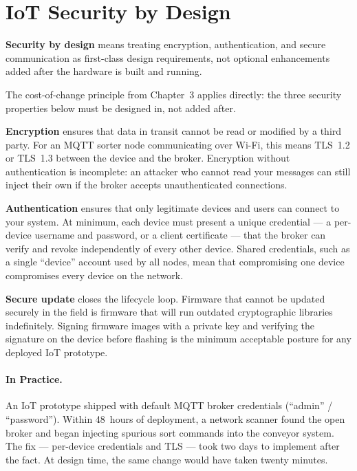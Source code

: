 \section{IoT Security by Design}
\label{sec:ch9-security}

\textbf{Security by design} means treating encryption,
authentication, and secure communication as first-class design requirements, not
optional enhancements added after the hardware is built and running.

The cost-of-change principle from Chapter~3 applies directly: the three security
properties below must be designed in, not added after.

\textbf{Encryption} ensures that data in transit cannot be read
or modified by a third party.
For an MQTT sorter node communicating over Wi-Fi, this means TLS~1.2 or TLS~1.3
between the device and the broker.
Encryption without authentication is incomplete: an attacker who cannot read your
messages can still inject their own if the broker accepts unauthenticated
connections.

\textbf{Authentication} ensures that only legitimate devices
and users can connect to your system.
At minimum, each device must present a unique credential --- a per-device username
and password, or a client certificate --- that the broker can verify and revoke
independently of every other device.
Shared credentials, such as a single ``device'' account used by all nodes, mean
that compromising one device compromises every device on the network.

\textbf{Secure update} closes the lifecycle loop.
Firmware that cannot be updated securely in the field is firmware that will run
outdated cryptographic libraries indefinitely.
Signing firmware images with a private key and verifying the signature on the
device before flashing is the minimum acceptable posture for any deployed IoT
prototype.

\paragraph{In Practice.}
An IoT prototype shipped with default MQTT broker credentials (``admin'' /
``password'').
Within 48~hours of deployment, a network scanner found the open broker and began
injecting spurious sort commands into the conveyor system.
The fix --- per-device credentials and TLS --- took two days to implement after
the fact.
At design time, the same change would have taken twenty minutes.

